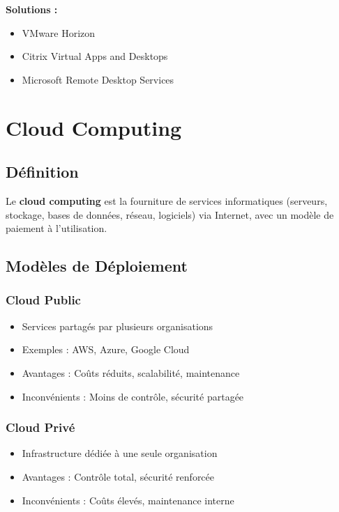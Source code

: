 \documentclass[11pt,a4paper]{article}
\begin{document}
\textbf{Solutions :}
\begin{itemize}
    \item VMware Horizon
    \item Citrix Virtual Apps and Desktops
    \item Microsoft Remote Desktop Services
\end{itemize}

\section{Cloud Computing}

\subsection{Définition}

\begin{definitionbox}
Le \textbf{cloud computing} est la fourniture de services informatiques (serveurs, stockage, bases de données, réseau, logiciels) via Internet, avec un modèle de paiement à l'utilisation.
\end{definitionbox}

\subsection{Modèles de Déploiement}

\subsubsection{Cloud Public}
\begin{itemize}
    \item Services partagés par plusieurs organisations
    \item Exemples : AWS, Azure, Google Cloud
    \item Avantages : Coûts réduits, scalabilité, maintenance
    \item Inconvénients : Moins de contrôle, sécurité partagée
\end{itemize}

\subsubsection{Cloud Privé}
\begin{itemize}
    \item Infrastructure dédiée à une seule organisation
    \item Avantages : Contrôle total, sécurité renforcée
    \item Inconvénients : Coûts élevés, maintenance interne
\end{itemize}
\end{document}
